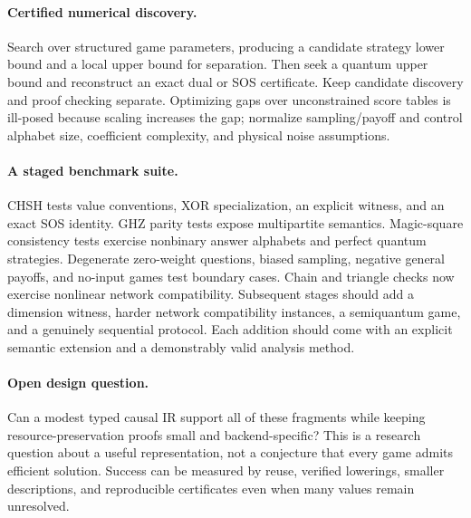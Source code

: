 \paragraph{Certified numerical discovery.}
Search over structured game parameters, producing a candidate strategy lower
bound and a local upper bound for separation. Then seek a quantum upper bound
and reconstruct an exact dual or SOS certificate. Keep candidate discovery
and proof checking separate. Optimizing gaps over unconstrained score tables
is ill-posed because scaling increases the gap; normalize sampling/payoff and
control alphabet size, coefficient complexity, and physical noise assumptions.

\paragraph{A staged benchmark suite.}
CHSH tests value conventions, XOR specialization, an explicit witness, and
an exact SOS identity. GHZ parity tests expose multipartite semantics.
Magic-square consistency tests exercise nonbinary answer alphabets and
perfect quantum strategies. Degenerate zero-weight questions, biased
sampling, negative general payoffs, and no-input games test boundary cases.
Chain and triangle checks now exercise nonlinear network compatibility.
Subsequent stages should add a dimension witness, harder network compatibility
instances, a semiquantum game, and a genuinely sequential protocol. Each
addition should come with an explicit semantic extension and
a demonstrably valid analysis method.

\paragraph{Open design question.}
Can a modest typed causal IR support all of these fragments while keeping
resource-preservation proofs small and backend-specific? This is a research
question about a useful representation, not a conjecture that every game
admits efficient solution. Success can be measured by reuse, verified
lowerings, smaller descriptions, and reproducible certificates even when
many values remain unresolved.
